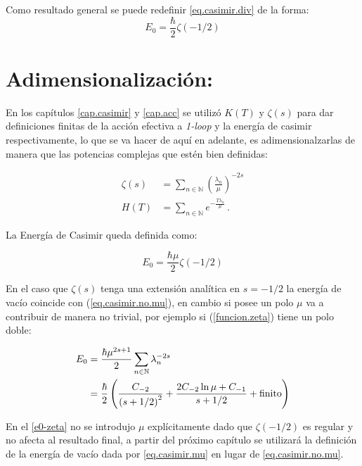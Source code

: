 Como resultado general se puede redefinir \ref{eq.casimir.div} de la forma:
\begin{equation}
E _0 = \frac{\hbar}{2} \zeta  (-1/2)
\label{eq.casimir.no.mu}
\end{equation}

\bigskip

\section{Adimensionalización:}

\medskip

En los capítulos \ref{cap.casimir} y \ref{cap.acc} se utilizó $K(T)$ y $\zeta (s)$ para dar definiciones finitas de la acción efectiva a {\it 1-loop} y la energía de casimir respectivamente, lo que se va hacer de aquí en adelante, es adimensionalzarlas de manera que las potencias complejas que estén bien definidas:

\begin{equation}
\begin{aligned}
\zeta  (s) &= \sum\limits_{n \in \mathbb N} \left( \frac{\lambda _n}{\mu }  \right) ^{-2s } \\[10pt]
H \left( T \right)  &= \sum\limits_{n \in \mathbb N} e ^{- \frac{T \lambda _{n}}{\mu} } \, .
\end{aligned}
\label{def.adim}
\end{equation}

La Energía de Casimir queda definida como:

\begin{equation}
E _0 = \frac{\hbar \mu}{2} \zeta  (-1/2)
\label{eq.casimir.mu}
\end{equation}

En el caso que $\zeta (s)$ tenga una extensión analítica en $s=-1/2$ la energía de vacío coincide con (\ref{eq.casimir.no.mu}), en cambio si posee un polo $\mu$ va a contribuir de manera no trivial, por ejemplo si (\ref{funcion.zeta}) tiene un polo doble:

\begin{equation}
\begin{aligned}
E _0 &= 
\frac{\hbar \mu ^{2s+1}}{2} 
\sum\limits_{n \in \mathbb N}  \lambda _n   ^{-2s } \\ &= 
\frac{\hbar }{2} 
\left(
		\frac{C _{-2}}{ \left( s+1/2 \right) ^2} + \frac{2 C _{-2} \ln \mu + C _{-1}}{s+1/2} + {\rm finito} 
		\right) 
\end{aligned}
\end{equation}

En el \ref{e0-zeta} no se introdujo $\mu$ explícitamente dado que $\zeta (-1/2)$ es regular y no afecta al resultado final, a partir del próximo capítulo se utilizará la definición de la energía de vacío dada por \ref{eq.casimir.mu} en lugar de \ref{eq.casimir.no.mu}.